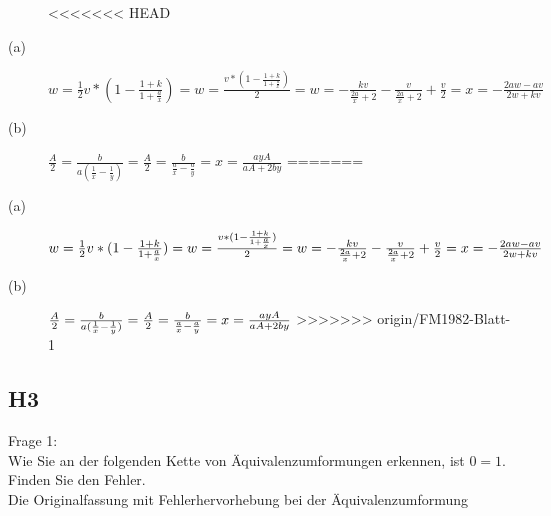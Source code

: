 \documentclass[12pt,a4paper]{article}
\begin{document}
\begin{description}
<<<<<<< HEAD
\item[(a)]{$w = \frac{1}{2} v * (1 - \frac{1 + k}{1 + \frac{a}{x}}) = w = \frac{v * (1 - \frac{1 + k}{1 + \frac{a}{x}})}{2} = w = - \frac{kv}{\frac{2a}{x} + 2} - \frac{v}{\frac{2a}{x} + 2} + \frac{v}{2} = x = - \frac{2aw - av}{2w + kv}$}
\item[(b)]{$\frac{A}{2} = \frac{b}{a(\frac{1}{x} - \frac{1}{y})} = \frac{A}{2} = \frac{b}{\frac{a}{x} - \frac{a}{y}} = x = \frac{ayA}{aA + 2by}$}
=======
\item[(a)]{$w\\= \frac{1}{2} v * (1 - \frac{1 + k}{1 + \frac{a}{x}})\\= w\\= \frac{v * (1 - \frac{1 + k}{1 + \frac{a}{x}})}{2}\\= w\\= - \frac{kv}{\frac{2a}{x} + 2} - \frac{v}{\frac{2a}{x} + 2} + \frac{v}{2}\\= x\\= - \frac{2aw - av}{2w + kv}$}
\item[(b)]{$\frac{A}{2}\\= \frac{b}{a(\frac{1}{x} - \frac{1}{y})}\\= \frac{A}{2}\\= \frac{b}{\frac{a}{x} - \frac{a}{y}}\\= x\\= \frac{ayA}{aA + 2by}$}
>>>>>>> origin/FM1982-Blatt-1
\end{description}

\subsection{H3}

Frage 1:
\\[2ex]
Wie Sie an der folgenden Kette von Äquivalenzumformungen erkennen, ist $0 = 1$. Finden Sie den Fehler.
\\[2ex]
Die Originalfassung mit Fehlerhervorhebung bei der Äquivalenzumformung
\end{document}
